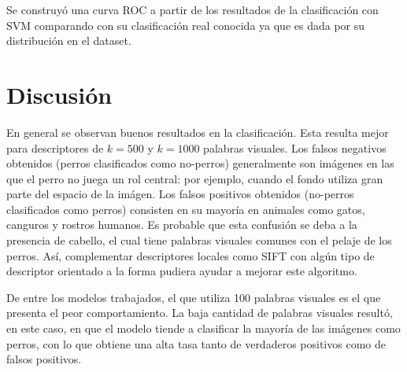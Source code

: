 \documentclass[12pt]{article}
\begin{document}
Se construyó una curva ROC a partir de los resultados de la clasificación con SVM comparando con su clasificación real conocida ya que es dada por su distribución en el dataset.

\section{Discusión}

En general se observan buenos resultados en la clasificación. Esta resulta mejor
para descriptores de $k=500$ y $k=1000$ palabras visuales.  Los falsos negativos
obtenidos (perros clasificados como no-perros) generalmente son imágenes en las
que el perro no juega un rol central: por ejemplo, cuando el fondo utiliza gran parte del
espacio de la imágen. Los falsos positivos obtenidos (no-perros clasificados
como perros) consisten en su mayoría en animales como gatos, canguros y rostros
humanos. Es probable que esta confusión se deba a la presencia de cabello, el
cual tiene palabras visuales comunes con el pelaje de los perros. Así,
complementar descriptores locales como SIFT con algún tipo de descriptor
orientado a la forma pudiera ayudar a mejorar este algoritmo.

De entre los modelos trabajados, el que utiliza 100 palabras visuales es el que
presenta el peor comportamiento. La baja cantidad de palabras visuales resultó,
en este caso, en que el modelo tiende a clasificar la mayoría de las imágenes
como perros, con lo que obtiene una alta tasa tanto de verdaderos positivos como
de falsos positivos.
\end{document}
